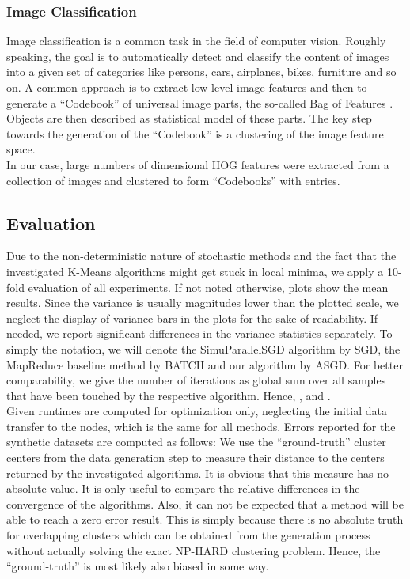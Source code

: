 \documentclass{acm_proc_article-sp}
\begin{document}
\subsubsection*{Image Classification}  
Image classification is a common task in the field of computer vision. Roughly
speaking, the goal is to automatically detect and classify the content of
images into a given set of categories like persons, cars, airplanes, bikes,
furniture and so on. A common approach is to extract low level image features 
and then to generate a ``Codebook'' of universal image parts, the so-called 
Bag of Features \cite{nowak2006sampling}. Objects are then described 
as statistical model of these parts. The key step towards the generation of
the ``Codebook'' is a clustering of the image feature space.\\
In our case, large numbers of  dimensional HOG features 
\cite{zhu2006fast} were extracted from a collection of images and clustered 
to form ``Codebooks'' with  entries.   
 
\subsection{Evaluation}
Due to the non-deterministic nature of stochastic methods and the fact that 
the investigated K-Means algorithms might get stuck in local minima, we  
apply a 10-fold evaluation of all experiments. If not noted otherwise, plots
show the mean results. Since the variance is usually magnitudes lower than
the plotted scale, we neglect the display of variance bars in the plots for the 
sake of readability. If needed, we report significant differences in the variance
statistics separately. To simply the notation, we will denote the SimuParallelSGD \cite{SGDsmola}
algorithm by SGD, the MapReduce baseline method \cite{chu2007map} by BATCH and
our algorithm by ASGD.   
For better comparability, we give the number of iterations 
as global sum over all samples that have been touched by the respective algorithm.
Hence, ,  and 
.\\ 
Given runtimes are computed for optimization only, neglecting the initial data transfer
to the nodes, which is the same for all methods.       
Errors reported for the synthetic datasets are computed as follows: We use the
``ground-truth'' cluster centers from the data generation step to measure their
distance to the centers returned by the investigated algorithms. It is obvious
that this measure has no absolute value. It is only useful to compare the relative
differences in the convergence of the algorithms. Also, it can not be expected that
a method will be able to reach a zero error result. This is simply because 
there is no absolute truth for 
overlapping clusters which can be obtained from the generation process without
actually solving the exact NP-HARD clustering problem. Hence, the ``ground-truth''
is most likely also biased in some way.       
\end{document}

